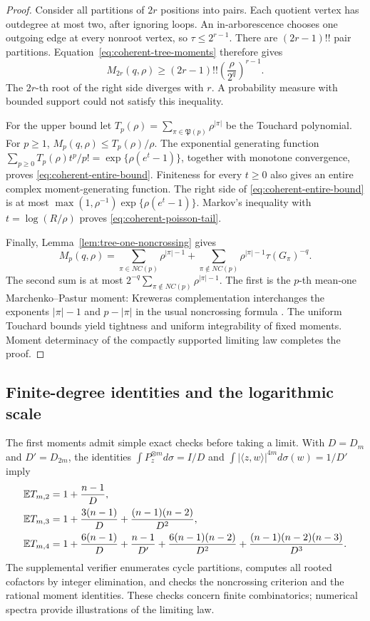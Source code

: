\begin{proof}
Consider all partitions of $2r$ positions into pairs.  Each quotient
vertex has outdegree at most two, after ignoring loops.  An
in-arborescence chooses one outgoing edge at every nonroot vertex,
so $\tau\leq2^{r-1}$.  There are $(2r-1)!!$ pair partitions.
Equation~\eqref{eq:coherent-tree-moments} therefore gives
\begin{equation}
 M_{2r}(q,\rho)
 \geq (2r-1)!!\left(\frac{\rho}{2^q}\right)^{r-1}.
 \label{eq:coherent-pairing-lower-bound}
\end{equation}
The $2r$-th root of the right side diverges with $r$.  A probability
measure with bounded support could not satisfy this inequality.

For the upper bound let
$T_p(\rho)=\sum_{\pi\in\mathfrak P(p)}\rho^{|\pi|}$
be the Touchard polynomial.  For $p\geq1$,
$M_p(q,\rho)\leq T_p(\rho)/\rho$.
The exponential generating function
$\sum_{p\geq0}T_p(\rho)t^p/p!=\exp\{\rho(e^t-1)\}$,
together with monotone convergence, proves
\eqref{eq:coherent-entire-bound}.  Finiteness for every $t\geq0$
also gives an entire complex moment-generating function.  The right
side of \eqref{eq:coherent-entire-bound} is at most
$\max(1,\rho^{-1})\exp\{\rho(e^t-1)\}$.
Markov's inequality with $t=\log(R/\rho)$ proves
\eqref{eq:coherent-poisson-tail}.

Finally, Lemma~\ref{lem:tree-one-noncrossing} gives
\[
 M_p(q,\rho)=
 \sum_{\pi\in NC(p)}\rho^{|\pi|-1}
 +\sum_{\pi\notin NC(p)}\rho^{|\pi|-1}\tau(G_\pi)^{-q}.
\]
The second sum is at most
$2^{-q}\sum_{\pi\notin NC(p)}\rho^{|\pi|-1}$.
The first is the $p$-th mean-one Marchenko--Pastur moment:
Kreweras complementation interchanges the exponents $|\pi|-1$
and $p-|\pi|$ in the usual noncrossing formula
\cite{prob_nica_speicher2006}.  The uniform Touchard bounds yield
tightness and uniform integrability of fixed moments.  Moment
determinacy of the compactly supported limiting law completes the
proof.
\end{proof}

\subsection{Finite-degree identities and the logarithmic scale}

The first moments admit simple exact checks before taking a limit.
With $D=D_m$ and $D'=D_{2m}$, the identities
$\int P_z^{\otimes m}d\sigma=I/D$ and
$\int|\langle z,w\rangle|^{4m}d\sigma(w)=1/D'$ imply
\begin{align}
 \mathbb E T_{m,2}&=1+\frac{n-1}{D},\notag\\
 \mathbb E T_{m,3}&=1+\frac{3(n-1)}D
                     +\frac{(n-1)(n-2)}{D^2},\notag\\
 \mathbb E T_{m,4}&=1+\frac{6(n-1)}D+\frac{n-1}{D'}
   +\frac{6(n-1)(n-2)}{D^2}
   +\frac{(n-1)(n-2)(n-3)}{D^3}.
 \label{eq:coherent-finite-moments}
\end{align}
The supplemental verifier enumerates cycle partitions, computes all
rooted cofactors by integer elimination, and checks the noncrossing
criterion and the rational moment identities.  These checks concern
finite combinatorics; numerical spectra provide illustrations of the
limiting law.

